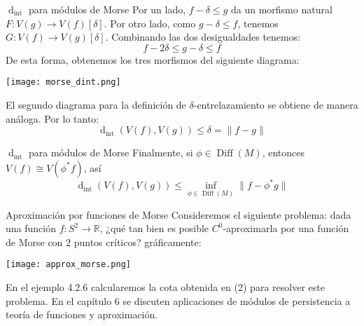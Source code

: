 \documentclass{beamer}
\newcounter{Ejercicio}
\newcommand\norm[1]{\lVert#1\rVert}
\def\dint{\operatorname{d}_{\operatorname{int}}}
\def \re{{\mathbb R}}
\begin{document}
\begin{frame}{$\dint$ para módulos de Morse}
Por un lado, $f-\delta \leq g$ da un morfismo natural \(F:V(g)\to V(f)[\delta]\). Por otro lado, como $g-\delta\leq f$, tenemos \(G:V(f)\to V(g)[\delta]\). Combinando las dos desigualdades tenemos:
\[f-2\delta\leq g-\delta\leq f\]
\pause
De esta forma, obtenemos los tres morfismos del siguiente diagrama:
\begin{center}
\texttt{[image: morse\_dint.png]}
\end{center}
El segundo diagrama para la definición de $\delta$-entrelazamiento se obtiene de manera análoga. Por lo tanto:
\[\dint(V(f),V(g))\leq\delta=\norm{f-g}\]
\end{frame}

\begin{frame}{$\dint$ para módulos de Morse}
Finalmente, si $\phi\in\operatorname{Diff}(M)$, entonces $V(f)\cong V(\phi^*f)$, así
\begin{equation}
    \dint(V(f),V(g))\leq\inf_{\phi\in\operatorname{Diff}(M)}\norm{f-\phi^*g}
\end{equation}
\end{frame}

\begin{frame}{Aproximación por funciones de Morse}
Consideremos el siguiente problema: dada una función $f:S^2\to\re$, ¿qué tan bien es posible $C^0$-aproximarla por una función de Morse con 2 puntos críticos? gráficamente:
\begin{center}
\texttt{[image: approx\_morse.png]}
\end{center}
En el ejemplo 4.2.6 calcularemos la cota obtenida en (2) para resolver este problema. En el capítulo 6 se discuten aplicaciones de módulos de persistencia a teoría de funciones y aproximación. 
\end{frame}
%
%
%
%


%
%
%


%
%
%
%
%
%
%
%
\end{document}
